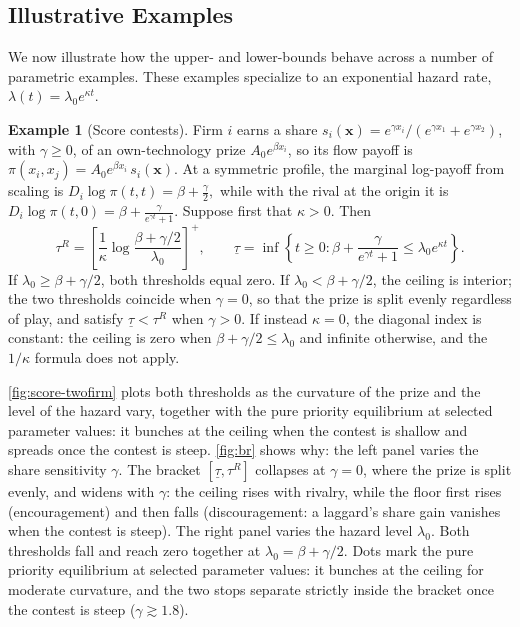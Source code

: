 \documentclass[12pt,reqno]{article}
\theoremstyle{definition} \newtheorem{example}{Example}
\theoremstyle{definition} \newtheorem{condition}{Condition}
\theoremstyle{definition} \newtheorem{corollary}{Corollary}
\theoremstyle{definition} \newtheorem{claim}{Claim}
\theoremstyle{definition} \newtheorem{definition}{Definition}
\theoremstyle{definition} \newtheorem{conjecture}{Conjecture}
\theoremstyle{definition} \newtheorem{Lemma}{Lemma}
\theoremstyle{definition} \newtheorem{lemma}{Lemma}
\theoremstyle{plain} \newtheorem{theorem}{Theorem}
\theoremstyle{definition} \newtheorem{assumption}{Assumption}
\theoremstyle{definition} \newtheorem*{assumptionnonumber}{Assumption}
\theoremstyle{definition} \newtheorem*{theoremNoNumber}{Proposition}
\theoremstyle{definition}
\theoremstyle{definition}\newtheorem{proposition}{Proposition}
\theoremstyle{definition} \newtheorem{result}{Result}
\theoremstyle{definition} \newtheorem*{definitionNoNumber}{Definition}
\theoremstyle{definition} \newtheorem{Definition}{Definition}
\theoremstyle{definition} \newtheorem*{DefinitionNoNumber}{Definition}
\theoremstyle{definition} \newtheorem*{fact}{Fact}
\theoremstyle{definition} \newtheorem*{property}{Property}
\theoremstyle{definition} \newtheorem{remark}{Remark}
\begin{document}
\subsection{Illustrative Examples}
We now illustrate how the upper- and lower-bounds behave across a number of parametric examples. These examples specialize to an exponential hazard rate, $\lambda(t)=\lambda_{0}e^{\kappa t}$.

\begin{example}[Score contests]
Firm $i$ earns a share $s_i(\bm x)=e^{\gamma x_i}/(e^{\gamma x_1}+e^{\gamma x_2})$, with $\gamma\ge0$, of an own-technology prize $A_0e^{\beta x_i}$, so its flow payoff is
$
\pi(x_i,x_j)=A_0e^{\beta x_i}\,s_i(\bm x).
$
At a symmetric profile, the marginal log-payoff from scaling is
$
D_i\log\pi(t,t)=\beta+\frac{\gamma}{2},
$
while with the rival at the origin it is
$
D_i\log\pi(t,0)=\beta+\frac{\gamma}{e^{\gamma t}+1}.
$
Suppose first that $\kappa>0$. Then
\[
\tau^R=\left[\frac1\kappa\log\frac{\beta+\gamma/2}{\lambda_0}\right]^+,
\qquad
\underline\tau
=
\inf\left\{t\geq 0:
\beta+\frac{\gamma}{e^{\gamma t}+1}
\leq
\lambda_0e^{\kappa t}
\right\}.
\]
If $\lambda_0\geq\beta+\gamma/2$, both thresholds equal zero. If $\lambda_0<\beta+\gamma/2$, the ceiling is interior; the two thresholds coincide when $\gamma=0$, so that the prize is split evenly regardless of play, and satisfy $\underline\tau<\tau^R$ when $\gamma>0$. If instead $\kappa=0$, the diagonal index is constant: the ceiling is zero when $\beta+\gamma/2\leq\lambda_0$ and infinite otherwise, and the $1/\kappa$ formula does not apply.

\cref{fig:score-twofirm} plots both thresholds as the curvature of the prize and the level of the hazard vary, together with the pure priority equilibrium at selected parameter values: it bunches at the ceiling when the contest is shallow and spreads once the contest is steep. \cref{fig:br} shows why: %
the left panel varies the share sensitivity $\gamma$. The bracket $[\underline\tau,\tau^R]$ collapses at $\gamma=0$, where the prize is split evenly, and widens with $\gamma$: the ceiling rises with rivalry, while the floor first rises (encouragement) and then falls (discouragement: a laggard's share gain vanishes when the contest is steep). The right panel varies the hazard level $\lambda_0$. Both thresholds fall and reach zero together at $\lambda_0=\beta+\gamma/2$. Dots mark the pure priority equilibrium at selected parameter values: it bunches at the ceiling for moderate curvature, and the two stops separate strictly inside the bracket once the contest is steep ($\gamma\gtrsim1.8$).


\end{example}
\end{document}
